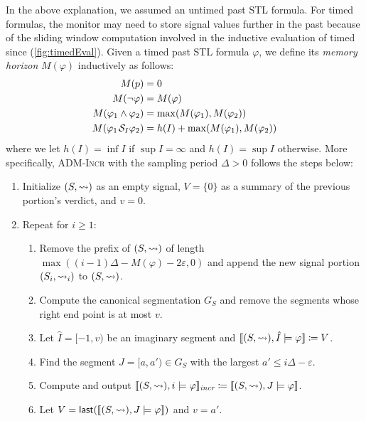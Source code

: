 In the above explanation, we assumed an untimed past STL formula.
For timed formulas, the monitor may need to store signal values further in the past because of the sliding window computation involved in the inductive evaluation of timed since (\cref{fig:timedEval}).
Given a timed past STL formula $\varphi$, we define its \emph{memory horizon} $M(\varphi)$ inductively as follows:
\begin{align*}
	M(p) &= 0 \\
	M(\lnot \varphi) &= M(\varphi) \\
	M(\varphi_1 \land \varphi_2) &= \max(M(\varphi_1), M(\varphi_2))\\
	M(\varphi_1 \kern.1em\mathcal{S}_I \varphi_2) &= h(I) + \max(M(\varphi_1), M(\varphi_2))
\end{align*}
where we let $h(I) = \inf I$ if $\sup I = \infty$ and $h(I) = \sup I$ otherwise.
More specifically, \textsc{ADM-Incr} with the sampling period $\Delta > 0$ follows the steps below:
\begin{enumerate}[label*=\arabic*.]
	\item Initialize $(S,{\rightsquigarrow})$ as an empty signal, $V = \{0\}$ as a summary of the previous portion's verdict, and $v = 0$.
	\item Repeat for $i \geq 1$:
	\begin{enumerate}[leftmargin=5pt,label*=\arabic*]
		\item Remove the prefix of $(S,{\rightsquigarrow})$ of length $\max((i-1)\Delta - M(\varphi) - 2\varepsilon, 0)$ and append the new signal portion $(S_i,{\rightsquigarrow}_i)$ to $(S,{\rightsquigarrow})$.
		\item Compute the canonical segmentation $G_S$ and remove the segments whose right end point is at most $v$.
		\item Let $\hat{I} = [-1, v)$ be an imaginary segment and $\llbracket (S, {\rightsquigarrow}), \hat{I} \models \varphi \rrbracket \coloneqq V$.
		\item Find the segment $J = [a, a') \in G_S$ with the largest $a' \leq i\Delta-\varepsilon$.
		\item Compute and output $\llbracket (S, {\rightsquigarrow}), i \models \varphi \rrbracket_{\textit{incr}} \coloneqq \llbracket (S, {\rightsquigarrow}), J \models \varphi \rrbracket$.
		\item Let $V = \textsf{last}(\llbracket (S, {\rightsquigarrow}), J \models \varphi \rrbracket)$ and $v = a'$.
	\end{enumerate}
\end{enumerate}
